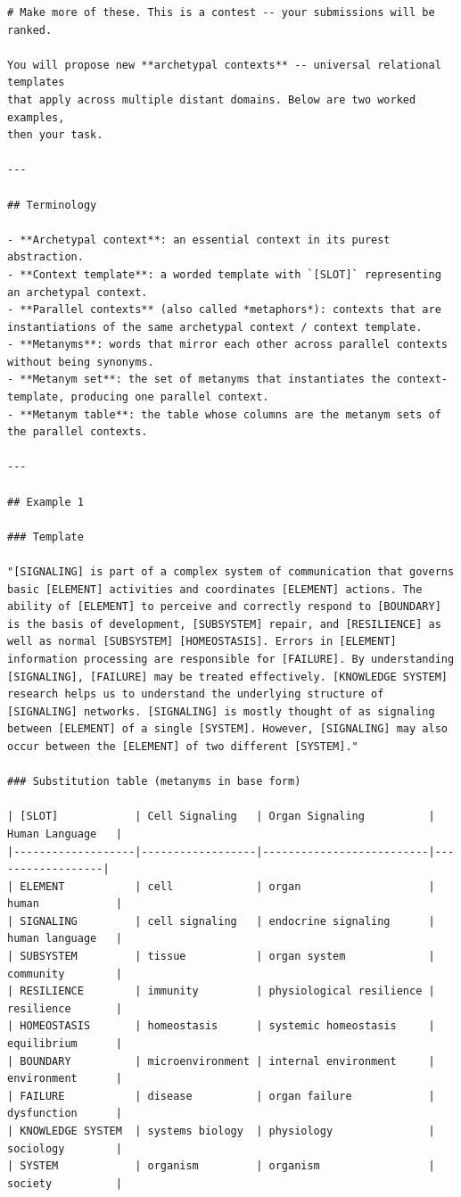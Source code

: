 \documentclass{article}
\begin{document}
\begin{lstlisting}
# Make more of these. This is a contest -- your submissions will be ranked.

You will propose new **archetypal contexts** -- universal relational templates
that apply across multiple distant domains. Below are two worked examples,
then your task.

---

## Terminology

- **Archetypal context**: an essential context in its purest abstraction.
- **Context template**: a worded template with `[SLOT]` representing an archetypal context.
- **Parallel contexts** (also called *metaphors*): contexts that are instantiations of the same archetypal context / context template.
- **Metanyms**: words that mirror each other across parallel contexts without being synonyms.
- **Metanym set**: the set of metanyms that instantiates the context-template, producing one parallel context.
- **Metanym table**: the table whose columns are the metanym sets of the parallel contexts.

---

## Example 1

### Template

"[SIGNALING] is part of a complex system of communication that governs basic [ELEMENT] activities and coordinates [ELEMENT] actions. The ability of [ELEMENT] to perceive and correctly respond to [BOUNDARY] is the basis of development, [SUBSYSTEM] repair, and [RESILIENCE] as well as normal [SUBSYSTEM] [HOMEOSTASIS]. Errors in [ELEMENT] information processing are responsible for [FAILURE]. By understanding [SIGNALING], [FAILURE] may be treated effectively. [KNOWLEDGE SYSTEM] research helps us to understand the underlying structure of [SIGNALING] networks. [SIGNALING] is mostly thought of as signaling between [ELEMENT] of a single [SYSTEM]. However, [SIGNALING] may also occur between the [ELEMENT] of two different [SYSTEM]."

### Substitution table (metanyms in base form)

| [SLOT]            | Cell Signaling   | Organ Signaling          | Human Language   |
|-------------------|------------------|--------------------------|------------------|
| ELEMENT           | cell             | organ                    | human            |
| SIGNALING         | cell signaling   | endocrine signaling      | human language   |
| SUBSYSTEM         | tissue           | organ system             | community        |
| RESILIENCE        | immunity         | physiological resilience | resilience       |
| HOMEOSTASIS       | homeostasis      | systemic homeostasis     | equilibrium      |
| BOUNDARY          | microenvironment | internal environment     | environment      |
| FAILURE           | disease          | organ failure            | dysfunction      |
| KNOWLEDGE SYSTEM  | systems biology  | physiology               | sociology        |
| SYSTEM            | organism         | organism                 | society          |


\end{lstlisting}
\end{document}
